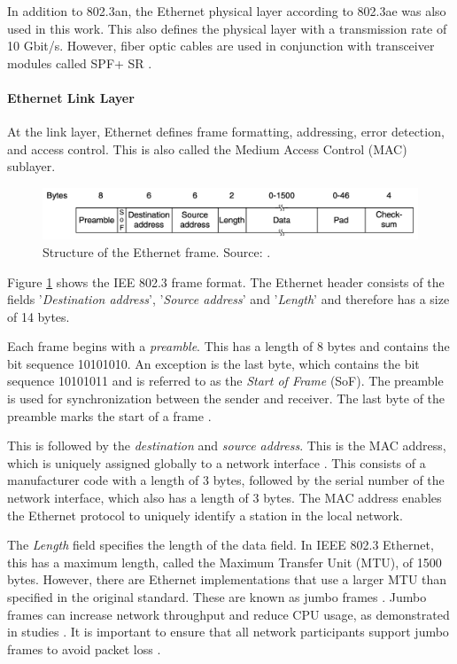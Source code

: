 In addition to 802.3an, the Ethernet physical layer according to 802.3ae was also used in this work. This also defines the physical layer with a transmission rate of 10 Gbit/s. However, fiber optic cables are used in conjunction with transceiver modules called SPF+ SR \cite{10GigabitEthernet}.

\paragraph{Ethernet Link Layer} \label{chap:EthLinkLayer}
At the link layer, Ethernet defines frame formatting, addressing, error detection, and access control. This is also called the Medium Access Control (MAC) sublayer.

\begin{figure}[h]
    \centering
    \includegraphics[width=1\linewidth]{figures/tcpip_refmodel/image5.png}
    \caption[Structure of the Ethernet frame]{Structure of the Ethernet frame. Source: \cite{Tanenbaum2010}.}
    \label{fig:EthernetFrame}
\end{figure}

Figure \ref{fig:EthernetFrame} shows the IEE 802.3 frame format. The Ethernet header consists of the fields '\textit{Destination address}', '\textit{Source address}' and '\textit{Length}' and therefore has a size of 14 bytes.

Each frame begins with a \textit{preamble}. This has a length of 8 bytes and contains the bit sequence 10101010. An exception is the last byte, which contains the bit sequence 10101011 and is referred to as the \textit{Start of Frame} (SoF). The preamble is used for synchronization between the sender and receiver. The last byte of the preamble marks the start of a frame \cite{Tanenbaum2010}.

This is followed by the \textit{destination} and \textit{source address}. This is the MAC address, which is uniquely assigned globally to a network interface \cite{Weigel2021}. This consists of a manufacturer code with a length of 3 bytes, followed by the serial number of the network interface, which also has a length of 3 bytes. The MAC address enables the Ethernet protocol to uniquely identify a station in the local network.

The \textit{Length} field specifies the length of the data field. In IEEE 802.3 Ethernet, this has a maximum length, called the Maximum Transfer Unit (MTU), of 1500 bytes. However, there are Ethernet implementations that use a larger MTU than specified in the original standard. These are known as jumbo frames \cite{EthernetJumboFrames2009}. Jumbo frames can increase network throughput and reduce CPU usage, as demonstrated in studies \cite{swsetup03}. It is important to ensure that all network participants support jumbo frames to avoid packet loss \cite{swsetup04}.

